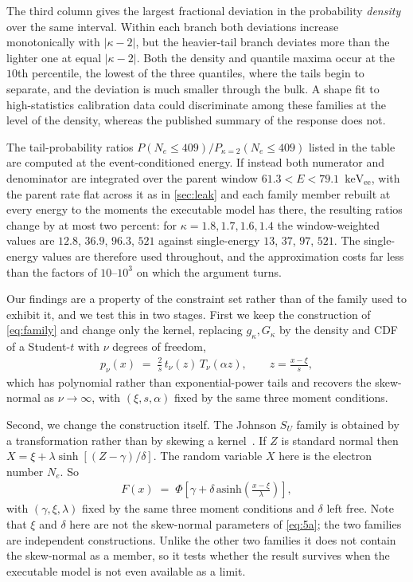\documentclass[11pt,a4paper]{article}
\newcommand{\keVee}{\ensuremath{\mathrm{keV_{ee}}}}
\begin{document}
The third column gives the largest fractional deviation in the
probability \emph{density} over the same interval. Within each branch
both deviations increase monotonically with \(|\kappa-2|\), but the
heavier-tail branch deviates more than the lighter one at equal
\(|\kappa-2|\). Both the density and quantile maxima occur at the
\(10\)th percentile, the lowest of the three quantiles, where the tails begin to
separate, and the deviation is much smaller through the bulk. A shape
fit to high-statistics calibration data could discriminate among these
families at the level of the density, whereas the published summary of
the response does not.


The tail-probability ratios \(P(N_e\le409)/P_{\kappa=2}(N_e\le409)\) listed
in the table are computed at the event-conditioned energy. If instead both
numerator and denominator are integrated over the parent window
\(61.3 < E < 79.1\)~\keVee, with the parent rate flat across it
as in \cref{sec:leak} and each family member rebuilt at every energy to the
moments the executable model has there, the resulting ratios change by at most
two percent: for \(\kappa = 1.8, 1.7, 1.6, 1.4\) the window-weighted values
are \(12.8\), \(36.9\), \(96.3\), \(521\) against single-energy \(13\),
\(37\), \(97\), \(521\). The single-energy values are therefore used
throughout, and the approximation costs far less than the factors of
\(10\)--\(10^{3}\) on which the argument turns. 

Our findings are a property of the constraint set rather than of the
family used to exhibit it, and we test this in two stages. First we keep
the construction of \cref{eq:family} and change only the kernel,
replacing \(g_\kappa,G_\kappa\) by the density and CDF of a
Student-\(t\) with \(\nu\) degrees of freedom,
\begin{align}
\label{eq:family2}
    p_\nu(x)\;=\;\frac{2}{s}\,t_\nu(z)\,T_\nu(\alpha z),\qquad z=\frac{x-\xi}{s},
\end{align}
which has polynomial rather than exponential-power tails and recovers
the skew-normal as \(\nu\to\infty\), with \((\xi,s,\alpha)\) fixed by
the same three moment conditions.


Second, we change the construction itself. The Johnson \(S_U\) family is
obtained by a transformation rather than by skewing a
kernel~\cite{Johnson}. If \(Z\) is standard normal then
\(X=\xi+\lambda\sinh[(Z-\gamma)/\delta]\). The random variable \(X\)
here is the electron number \(N_e\). So
\begin{align}
\label{eq:family3}
    F(x)\;=\;\Phi\!\left[\gamma+\delta\,\mathrm{asinh}\!\left(\frac{x-\xi}{\lambda}\right)\right],
\end{align}
with \((\gamma,\xi,\lambda)\) fixed by the same three moment conditions
and \(\delta\) left free. Note that \(\xi\) and \(\delta\) here are not
the skew-normal parameters of \cref{eq:5a}; the two families are
independent constructions. Unlike the other two families it does not
contain the skew-normal as a member, so it tests whether the result
survives when the executable model is not even available as a limit.
\end{document}
